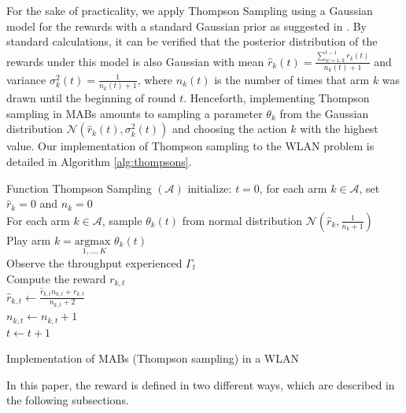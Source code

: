 \documentclass{article}
\begin{document}
For the sake of practicality, we apply Thompson Sampling using a Gaussian model for the rewards with a standard Gaussian prior as suggested in \cite{agrawal2013further}. By standard calculations, it can be verified that the posterior distribution of the rewards under this model is also Gaussian with mean $\hat{r}_k(t) = \frac{\sum_{w=1:k}^{t-1} r_k(t) }{n_k(t) + 1}$ and variance $\sigma_k^2(t) = \frac{1}{n_k(t) + 1}$, where $n_k(t)$ is the number of times that arm $k$ was drawn until the beginning of round $t$. Henceforth, implementing Thompson sampling in MABs amounts to sampling a parameter $\theta_k$ from the Gaussian distribution $\mathcal{N}\left(\hat{r}_k(t),\sigma_k^2(t)\right)$ and choosing the action $k$ with the highest value. Our implementation of Thompson sampling to the WLAN problem is detailed in Algorithm \ref{alg:thompsons}.	
\begin{algorithm}[h!]
	Function Thompson Sampling $(\mathcal{A})$\;
	initialize: $t=0$,  for each arm $k \in \mathcal{A}$, set $\hat{r}_{k} = 0$ and $n_k = 0$ \\
	{
		For each arm $k \in \mathcal{A}$, sample $\theta_k(t)$ from normal distribution $\mathcal{N}(\hat{r}_{k}, \frac{1}{n_k + 1})$ \\
		Play arm $k = \underset{1,...,K}{\text{argmax }} \theta_k(t) $ \\
		Observe the throughput experienced $\Gamma_t$\\			
		Compute the reward $r_{k,t}$ \\
		$ \hat{r}_{k,t} \leftarrow \frac{\hat{r}_{k,t}  n_{k,t} + r_{k,t}}{n_{k,t} + 2}$\\
		$n_{k,t} \leftarrow n_{k,t} + 1$\\
		$t \leftarrow t + 1$
	}
	\caption{Implementation of MABs (Thompson sampling) in a WLAN}
	\label{alg:thompsons}
\end{algorithm}	

In this paper, the reward is defined in two different ways, which are described in the following subsections.

\end{document}
